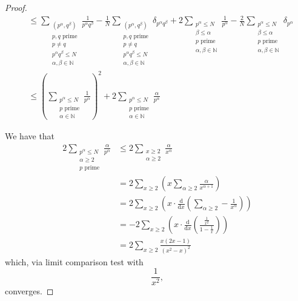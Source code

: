 \documentclass[12pt,reqno]{amsart}
\begin{document}
\begin{proof}
\begin{align*}
& \leq  \sum _{\substack{ \left( p ^{\alpha} ,q^{\beta} \right) \\ p,q \text{ prime} \\ p \neq q \\ p^{\alpha}q^{\beta} \leq N \\ \alpha,\beta \in \mathbb{N}  }} \frac{1}{ p ^{\alpha} q ^{\beta}} - \frac{1}{N}  \sum _{\substack{ \left( p ^{\alpha} ,q^{\beta} \right) \\ p,q \text{ prime} \\ p \neq q \\ p^{\alpha}q^{\beta} \leq N \\ \alpha,\beta \in \mathbb{N}  }} \delta_{p ^{\alpha}q ^{\beta}} +2 \sum _{\substack{ p ^{\alpha} \leq N \\ \beta \leq \alpha\\ p \text{ prime} \\ \alpha, \beta \in \mathbb{N}  }}\frac{1}{p ^{\alpha}} - \frac{2}{N}  \sum _{\substack{ p ^{\alpha} \leq N \\ \beta \leq \alpha\\ p \text{ prime} \\ \alpha, \beta \in \mathbb{N}  }}\delta_{p ^{\alpha}}   \\
& \leq \left( \sum _{\substack{ p ^{\alpha} \leq N \\ p \text{ prime} \\ \alpha \in \mathbb{N}  }} \frac{1}{p ^{\alpha}}  \right) ^{2} +  2 \sum _{\substack{ p ^{\alpha} \leq N \\ p \text{ prime} \\ \alpha \in  \mathbb{N} }} \frac{\alpha}{p ^{\alpha}}
\end{align*}

We have that
\begin{align*}
2 \sum _{\substack{ p ^{\alpha} \leq N \\ \alpha\geq 2\\ p \text{ prime} }} \frac{\alpha}{p ^{\alpha}} & \leq 2 \sum _{\substack{ x \geq 2 \\ \alpha \geq 2 }}  \frac{\alpha}{x ^{\alpha}} \\
& = 2\sum _{x \geq 2} \left( x \sum _{\alpha \geq 2} \frac{\alpha}{x ^{\alpha + 1}}  \right) \\
& = 2 \sum _{x \geq 2} \left( x \cdot \frac{\mathrm{d}}{\mathrm{d} x}\left( \sum _{\alpha \geq 2} - \frac{1}{x ^{\alpha}} \right)  \right) \\
& = -2 \sum _{x \geq 2} \left( x \cdot \frac{\mathrm{d}}{\mathrm{d} x}\left( \frac{\frac{1}{x^{2}} }{1 - \frac{1}{x} }  \right)  \right)\\
& = 2 \sum _{x \geq 2}  \frac{x (2x-1)}{\left( x^{2}-x \right) ^{2}}
\end{align*}
which, via limit comparison test with
\[
    \frac{1}{x^{2}} 
,\]
converges.


\end{proof}
\end{document}

